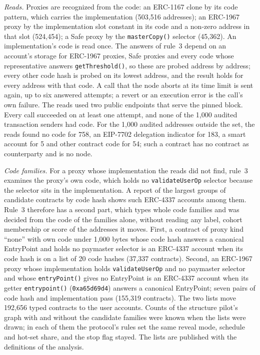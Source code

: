 \documentclass[10pt,letterpaper]{article}
\newcommand{\hash}[1]{\texttt{\small #1}}
\begin{document}
\textit{Reads.} Proxies are recognized from the code: an ERC-1167 clone by its code pattern, which carries the implementation (503,516 addresses); an ERC-1967 proxy by the implementation slot constant in its code and a non-zero address in that slot (524,454); a Safe proxy by the \texttt{masterCopy()} selector (45,362). An implementation's code is read once. The answers of rule~3 depend on an account's storage for ERC-1967 proxies, Safe proxies and every code whose representative answers \texttt{getThreshold()}, so these are probed address by address; every other code hash is probed on its lowest address, and the result holds for every address with that code. A call that the node aborts at its time limit is sent again, up to six answered attempts; a revert or an execution error is the call's own failure. The reads used two public endpoints that serve the pinned block. Every call succeeded on at least one attempt, and none of the 1,000 audited transaction senders had code. For the 1,000 audited addresses outside the set, the reads found no code for 758, an EIP-7702 delegation indicator for 183, a smart account for 5 and other contract code for 54; such a contract has no contract as counterparty and is no node.

\textit{Code families.} For a proxy whose implementation the reads did not find, rule~3 examines the proxy's own code, which holds no \texttt{validateUserOp} selector because the selector sits in the implementation. A report of the largest groups of candidate contracts by code hash shows such ERC-4337 accounts among them. Rule~3 therefore has a second part, which types whole code families and was decided from the code of the families alone, without reading any label, cohort membership or score of the addresses it moves. First, a contract of proxy kind ``none'' with own code under 1,000 bytes whose code hash answers a canonical EntryPoint and holds no paymaster selector is an ERC-4337 account when its code hash is on a list of 20 code hashes (37,337 contracts). Second, an ERC-1967 proxy whose implementation holds \texttt{validateUserOp} and no paymaster selector and whose \texttt{entryPoint()} gives no EntryPoint is an ERC-4337 account when its getter \texttt{entrypoint()} (\hash{0xa65d69d4}) answers a canonical EntryPoint; seven pairs of code hash and implementation pass (155,319 contracts). The two lists move 192,656 typed contracts to the user accounts. Counts of the structure pilot's graph with and without the candidate families were known when the lists were drawn; in each of them the protocol's rules set the same reveal mode, schedule and hot-set share, and the stop flag stayed. The lists are published with the definitions of the analysis.
\end{document}
